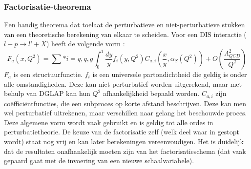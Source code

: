 \documentclass[a4paper,11pt]{article}
\numberwithin{equation}{section} %
\begin{document}
    \subsubsection{Factorisatie-theorema}
Een handig theorema dat toelaat de perturbatieve en niet-perturbatieve stukken van een  theoretische berekening van elkaar te scheiden.
Voor een DIS interactie ($l+p\rightarrow l’+X$) heeft de volgende vorm \cite{Martin}: 
\begin{equation}
F_a(x, Q^2) = \sum*{i=q,q,g} \int_0^1 \frac{dy}{y} f_i(y, Q^2) C_{a,i} \left( \frac{x}{y},\alpha_S(Q^2) \right) + O \left( \frac{\Lambda_{QCD}^2}{Q^2} \right) 
\end{equation}
$F_a$ is een structuurfunctie.
$f_i$ is een universele partondichtheid die geldig is onder alle omstandigheden.
Deze kan niet perturbatief worden uitgerekend, maar met behulp van DGLAP kan hun $Q^2$ afhankelijkheid bepaald worden.
$C_{a,i}$ zijn coëfficiëntfuncties, die een subproces op korte afstand beschrijven.
Deze kan men wel perturbatief uitrekenen, maar verschillen naar gelang het beschouwde proces.
Deze algemene vorm wordt vaak gebruikt en is geldig tot alle ordes in perturbatietheorie.
De keuze van de factorisatie zelf (welk deel waar in gestopt wordt) staat nog vrij en kan later berekeningen vereenvoudigen.
Het is duidelijk dat de resultaten onafhankelijk moeten zijn van het factorisatieschema (dat vaak gepaard gaat met de invoering van een nieuwe schaalvariabele).
\end{document}
